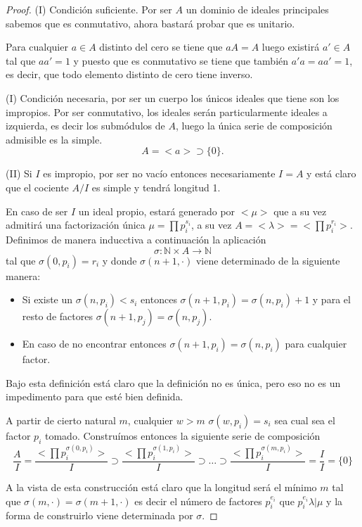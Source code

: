 \documentclass{article}
\newcommand{\N}{\mathbb{N}}
\begin{document}
\begin{proof}
(I) Condición suficiente. Por ser $A$ un dominio de ideales principales sabemos que es conmutativo, ahora bastará probar que es unitario. 

Para cualquier $a \in A$ distinto del cero se tiene que 
$a A = A$ luego existirá $a' \in A$ tal que 
$a a'=1$ y puesto que es conmutativo se tiene que también 
$a' a = a a'=1$, es decir, que todo elemento distinto de cero tiene inverso. 

(I) Condición necesaria, por ser un cuerpo los únicos ideales que tiene son los impropios. Por ser conmutativo, los ideales serán particularmente ideales a izquierda, es decir los submódulos de $A$, luego la única serie de composición admisible es la simple. 
\begin{equation*}
    A = <a> \supset \{0\}.
\end{equation*}

(II) Si $I$ es impropio, por ser no vacío entonces necesariamente 
$I=A$ y está claro que el cociente $A/I$ es simple y tendrá longitud 1. 

En caso de ser $I$ un ideal propio, estará generado por $<\mu>$ que a su vez admitirá una factorización única  $\mu = \prod p_i^{s_i}$, a su vez $A=<\lambda> = < \prod p_i ^{r_i}>$.  
Definimos de manera inducctiva a continuación la aplicación 
\begin{equation*}
    \sigma: \N \times A \longrightarrow \N
\end{equation*}
tal que $\sigma(0,p_i) = r_i$
y donde $\sigma(n+1, \cdot)$ viene determinado de la siguiente manera: 
\begin{itemize}
    \item Si existe un  $\sigma(n, p_i) < s_i$ entonces $\sigma(n+1, p_i) = \sigma(n, p_i)+1$ y para el resto de factores $\sigma(n+1, p_j) = \sigma(n, p_j)$.
    \item  En caso de no encontrar entonces $\sigma(n+1, p_i) = \sigma(n, p_i)$ para cualquier factor.
\end{itemize}

Bajo esta definición está claro que la definición no es única, pero eso no es un impedimento para que esté bien definida.

A partir de cierto natural $m$, cualquier $w>m$ $\sigma(w, p_i) = s_i$ sea cual sea el factor $p_i$ tomado. 
Construímos entonces la siguiente serie de composición
\begin{equation*} 
    \frac{A}{I} = 
    \frac{< \prod p_i ^{\sigma(0, p_i)}>}{I} 
    \supset  
    \frac{< \prod p_i ^{\sigma(1, p_i)}>}{I} 
    \supset 
    \ldots 
    \supset 
    \frac{< \prod p_i ^{\sigma(m, p_i)}>}{I}  
    = \frac{I}{I} 
    = 
    \{0\}
\end{equation*}


A la vista de esta construcción está claro que la longitud será el mínimo $m$ tal que 
$\sigma(m, \cdot)= \sigma(m+1, \cdot)$
es decir el número de factores $p_i^{e_i}$ que $p_i^{e_i} \lambda | \mu$
y la forma de construirlo viene determinada por $\sigma$. 
\end{proof}
\end{document}
